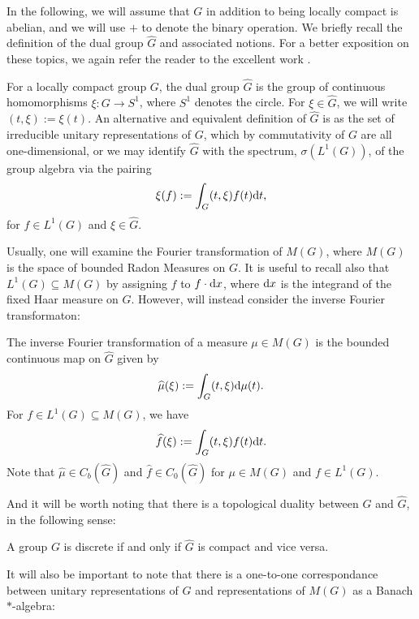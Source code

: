 In the following, we will assume that $G$ in addition to being locally compact is abelian, and we will use $+$ to denote the binary operation. We briefly recall the definition of the dual group $\hat G$ and associated notions. For a better exposition on these topics, we again refer the reader to the excellent work \cite{folland2016fourier}. 
\begin{definition}
For a locally compact group $G$, the dual group $\hat G$ is the group of continuous homomorphisms $\xi \colon G \to S^1$, where $S^1$ denotes the circle. For $\xi \in \hat G$, we will write $(t,\xi) := \xi(t)$. An alternative and equivalent definition of $\hat G$ is as the set of irreducible unitary representations of $G$, which by commutativity of $G$ are all one-dimensional, or we may identify $\hat G$ with the spectrum, $\sigma(L^1(G))$, of the group algebra via the pairing
\begin{align}
	\xi(f):=\int_G (t , \xi) f(t) \mathrm{d} t,
	\label{abel:fourier}
\end{align}
for $f \in L^1(G)$ and $\xi \in \hat G$. 
\end{definition}
Usually, one will examine the Fourier transformation of $M(G)$, where $M(G)$ is the space of bounded Radon Measures on $G$. It is useful to recall also that $L^1(G) \subseteq M(G)$ by assigning $f$ to $f \cdot \mathrm{d} x$, where $\mathrm{d} x$ is the integrand of the fixed Haar measure on $G$. However, will instead consider the inverse Fourier transformaton:
\begin{definition}
The inverse Fourier transformation of a measure $\mu \in M(G)$ is the bounded continuous map on $\hat G$ given by 
\begin{align*}
\widehat{\mu}(\xi) := \int_G	(t, \xi) \mathrm{d} \mu(t).
\end{align*}
For $f \in L^1(G) \subseteq M(G)$, we have
\begin{align*}
	\widehat{f}(\xi) := \int_G (t, \xi) f(t) \mathrm{d} t.
\end{align*}
Note that $\hat \mu \in C_b(\hat G)$ and $\hat f \in C_0(\hat G)$ for $\mu \in M(G)$ and $f \in L^1(G)$.
\end{definition}
And it will be worth noting that there is a topological duality between $G$ and $\hat G$, in the following sense:
\begin{proposition}
A group $G$ is discrete if and only if $\hat G$ is compact and vice versa.
\end{proposition}
It will also be important to note that there is a one-to-one correspondance between unitary representations of $G$ and representations of $M(G)$ as a Banach $*$-algebra:
